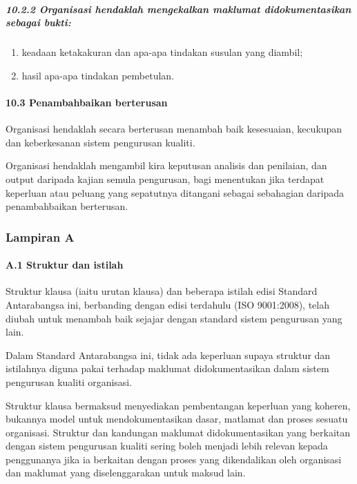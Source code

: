 \documentclass[
]{article}
\begin{document}
\hypertarget{organisasi-hendaklah-mengekalkan-maklumat-didokumentasikan-sebagai-bukti}{%
\subparagraph{10.2.2 Organisasi hendaklah mengekalkan maklumat
didokumentasikan sebagai
bukti:}\label{organisasi-hendaklah-mengekalkan-maklumat-didokumentasikan-sebagai-bukti}}

\begin{enumerate}
\def\labelenumi{\alph{enumi})}
\item
  keadaan ketakakuran dan apa-apa tindakan susulan yang diambil;
\item
  hasil apa-apa tindakan pembetulan.
\end{enumerate}

\hypertarget{penambahbaikan-berterusan}{%
\paragraph{10.3 Penambahbaikan
berterusan}\label{penambahbaikan-berterusan}}

Organisasi hendaklah secara berterusan menambah baik kesesuaian,
kecukupan dan keberkesanan sistem pengurusan kualiti.

Organisasi hendaklah mengambil kira keputusan analisis dan penilaian,
dan output daripada kajian semula pengurusan, bagi menentukan jika
terdapat keperluan atau peluang yang sepatutnya ditangani sebagai
sebahagian daripada penambahbaikan berterusan.

\hypertarget{lampiran-a}{%
\subsubsection{Lampiran A}\label{lampiran-a}}

\hypertarget{a.1-struktur-dan-istilah}{%
\paragraph{A.1 Struktur dan istilah}\label{a.1-struktur-dan-istilah}}

Struktur klausa (iaitu urutan klausa) dan beberapa istilah edisi
Standard Antarabangsa ini, berbanding dengan edisi terdahulu (ISO
9001:2008), telah diubah untuk menambah baik sejajar dengan standard
sistem pengurusan yang lain.

Dalam Standard Antarabangsa ini, tidak ada keperluan supaya struktur dan
istilahnya diguna pakai terhadap maklumat didokumentasikan dalam sistem
pengurusan kualiti organisasi.

Struktur klausa bermaksud menyediakan pembentangan keperluan yang
koheren, bukannya model untuk mendokumentasikan dasar, matlamat dan
proses sesuatu organisasi. Struktur dan kandungan maklumat
didokumentasikan yang berkaitan dengan sistem pengurusan kualiti sering
boleh menjadi lebih relevan kepada penggunanya jika ia berkaitan dengan
proses yang dikendalikan oleh organisasi dan maklumat yang
diselenggarakan untuk maksud lain.
\end{document}

